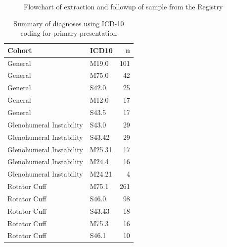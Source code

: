 \documentclass[
]{article}
\begin{document}
\begin{figure}[H]


\caption{\label{fig-strobe}Flowchart of extraction and followup of
sample from the Registry}

\end{figure}%

\begin{longtable}[]{@{}llr@{}}

\caption{\label{tbl-diagnosis}Summary of diagnoses using ICD-10 coding
for primary presentation}

\tabularnewline

\toprule\noalign{}
Cohort & ICD10 & n \\
\midrule\noalign{}
\endhead
\bottomrule\noalign{}
\endlastfoot
General & M19.0 & 101 \\
General & M75.0 & 42 \\
General & S42.0 & 25 \\
General & M12.0 & 17 \\
General & S43.5 & 17 \\
Glenohumeral Instability & S43.0 & 29 \\
Glenohumeral Instability & S43.42 & 29 \\
Glenohumeral Instability & M25.31 & 17 \\
Glenohumeral Instability & M24.4 & 16 \\
Glenohumeral Instability & M24.21 & 4 \\
Rotator Cuff & M75.1 & 261 \\
Rotator Cuff & S46.0 & 98 \\
Rotator Cuff & S43.43 & 18 \\
Rotator Cuff & M75.3 & 16 \\
Rotator Cuff & S46.1 & 10 \\

\end{longtable}
\end{document}
